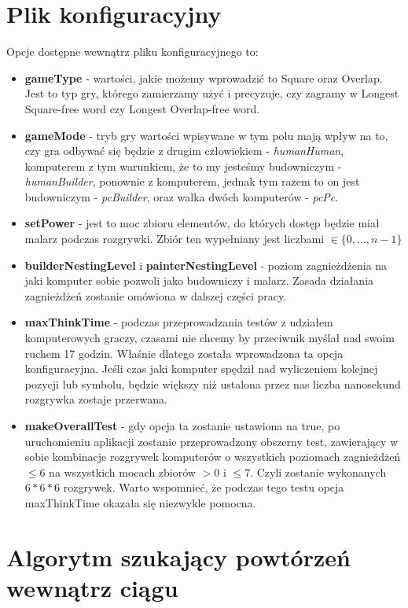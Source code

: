 \documentclass[document]{xmgr}
\begin{document}
\section{Plik konfiguracyjny}
Opcje dostępne wewnątrz pliku konfiguracyjnego to:
\begin{itemize}
\item \textbf{gameType} - wartości, jakie możemy wprowadzić to Square oraz Overlap. Jest to typ gry, którego zamierzamy użyć i precyzuje, czy zagramy w Longest Square-free word czy Longest Overlap-free word.
\item \textbf{gameMode} - tryb gry wartości wpisywane w tym polu mają wpływ na to, czy gra odbywać się będzie z drugim człowiekiem - \textit{humanHuman}, komputerem z tym warunkiem, że to my jesteśmy budowniczym - \textit{humanBuilder}, ponownie z komputerem, jednak tym razem to on jest budowniczym - \textit{pcBuilder}, oraz walka dwóch komputerów - \textit{pcPc}.
\item \textbf{setPower} - jest to moc zbioru elementów, do których dostęp będzie miał malarz podczas rozgrywki. Zbiór ten wypełniany jest liczbami $\in \{0, ...,n-1\}$
\item \textbf{builderNestingLevel} i \textbf{painterNestingLevel} - poziom zagnieżdżenia na jaki komputer sobie pozwoli jako budowniczy i malarz. Zasada działania zagnieżdżeń zostanie omówiona w dalszej części pracy.
\item \textbf{maxThinkTime} - podczas przeprowadzania testów z udziałem komputerowych graczy, czasami nie chcemy by przeciwnik myślał nad swoim ruchem 17 godzin. Właśnie dlatego została wprowadzona ta opcja konfiguracyjna. Jeśli czas jaki komputer spędził nad wyliczeniem kolejnej pozycji lub symbolu, będzie większy niż ustalona przez nas liczba nanosekund rozgrywka zostaje przerwana.
\item \textbf{makeOverallTest} - gdy opcja ta zostanie ustawiona na true, po uruchomieniu aplikacji zostanie przeprowadzony obszerny test, zawierający w sobie kombinacje rozgrywek komputerów o wszystkich poziomach zagnieżdżeń $\leq 6$ na wszystkich mocach zbiorów $>0 $ i $\leq 7$. Czyli zostanie wykonanych $6*6*6$ rozgrywek. Warto wspomnieć, że podczas tego testu opcja maxThinkTime okazała się niezwykle pomocna.
\end{itemize}

\section{Algorytm szukający powtórzeń wewnątrz ciągu}
\end{document}
